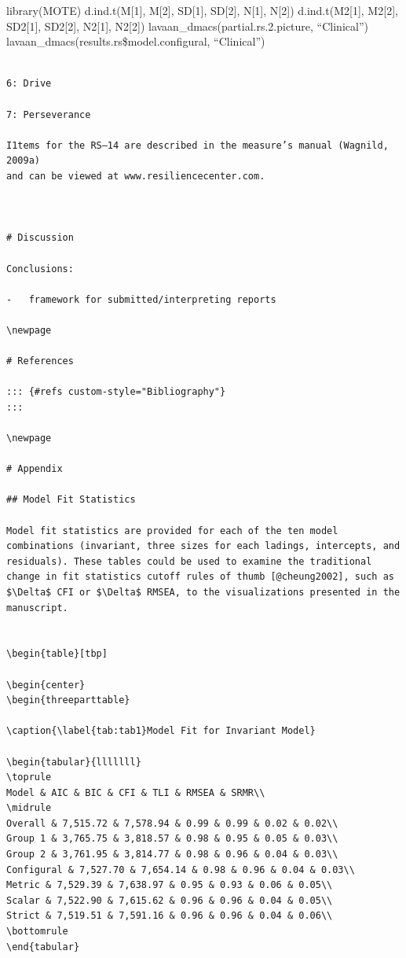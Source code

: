 \documentclass[
  man]{apa6}
\begin{document}
library(MOTE)
d.ind.t(M{[}1{]}, M{[}2{]}, SD{[}1{]}, SD{[}2{]}, N{[}1{]}, N{[}2{]})
d.ind.t(M2{[}1{]}, M2{[}2{]}, SD2{[}1{]}, SD2{[}2{]}, N2{[}1{]}, N2{[}2{]})
lavaan\_dmacs(partial.rs.2.picture, ``Clinical'')
lavaan\_dmacs(results.rs\$model.configural, ``Clinical'')

\begin{verbatim}

6: Drive

7: Perseverance

I1tems for the RS–14 are described in the measure’s manual (Wagnild, 2009a)
and can be viewed at www.resiliencecenter.com.



# Discussion

Conclusions:

-   framework for submitted/interpreting reports

\newpage

# References

::: {#refs custom-style="Bibliography"}
:::

\newpage

# Appendix

## Model Fit Statistics

Model fit statistics are provided for each of the ten model combinations (invariant, three sizes for each ladings, intercepts, and residuals). These tables could be used to examine the traditional change in fit statistics cutoff rules of thumb [@cheung2002], such as $\Delta$ CFI or $\Delta$ RMSEA, to the visualizations presented in the manuscript.


\begin{table}[tbp]

\begin{center}
\begin{threeparttable}

\caption{\label{tab:tab1}Model Fit for Invariant Model}

\begin{tabular}{lllllll}
\toprule
Model & AIC & BIC & CFI & TLI & RMSEA & SRMR\\
\midrule
Overall & 7,515.72 & 7,578.94 & 0.99 & 0.99 & 0.02 & 0.02\\
Group 1 & 3,765.75 & 3,818.57 & 0.98 & 0.95 & 0.05 & 0.03\\
Group 2 & 3,761.95 & 3,814.77 & 0.98 & 0.96 & 0.04 & 0.03\\
Configural & 7,527.70 & 7,654.14 & 0.98 & 0.96 & 0.04 & 0.03\\
Metric & 7,529.39 & 7,638.97 & 0.95 & 0.93 & 0.06 & 0.05\\
Scalar & 7,522.90 & 7,615.62 & 0.96 & 0.96 & 0.04 & 0.05\\
Strict & 7,519.51 & 7,591.16 & 0.96 & 0.96 & 0.04 & 0.06\\
\bottomrule
\end{tabular}


\end{verbatim}
\end{document}
